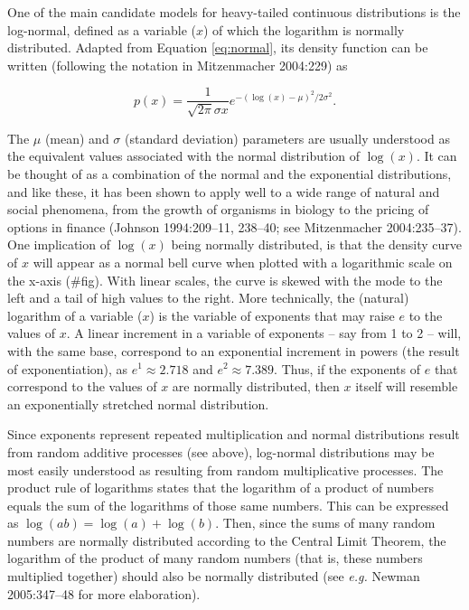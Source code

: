 \documentclass[
  12pt,
]{book}
\begin{document}
One of the main candidate models for heavy-tailed continuous distributions is the log-normal, defined as a variable (\(x\)) of which the logarithm is normally distributed. Adapted from Equation \eqref{eq:normal}, its density function can be written (following the notation in Mitzenmacher 2004:229) as

\begin{equation}
p(x)=\frac{1}{\sqrt{2\pi}\sigma x}e^{-(\log(x)-\mu)^2/2\sigma^2}.
\label{eq:log-normal}
\end{equation}

The \(\mu\) (mean) and \(\sigma\) (standard deviation) parameters are usually understood as the equivalent values associated with the normal distribution of \(\log(x)\). It can be thought of as a combination of the normal and the exponential distributions, and like these, it has been shown to apply well to a wide range of natural and social phenomena, from the growth of organisms in biology to the pricing of options in finance (Johnson 1994:209--11, 238--40; see Mitzenmacher 2004:235--37). One implication of \(\log (x)\) being normally distributed, is that the density curve of \(x\) will appear as a normal bell curve when plotted with a logarithmic scale on the x-axis (\#fig). With linear scales, the curve is skewed with the mode to the left and a tail of high values to the right. More technically, the (natural) logarithm of a variable (\(x\)) is the variable of exponents that may raise \(e\) to the values of \(x\). A linear increment in a variable of exponents -- say from 1 to 2 -- will, with the same base, correspond to an exponential increment in powers (the result of exponentiation), as \(e^1 \approx 2.718\) and \(e^2 \approx 7.389\). Thus, if the exponents of \(e\) that correspond to the values of \(x\) are normally distributed, then \(x\) itself will resemble an exponentially stretched normal distribution.

Since exponents represent repeated multiplication and normal distributions result from random additive processes (see above), log-normal distributions may be most easily understood as resulting from random multiplicative processes. The product rule of logarithms states that the logarithm of a product of numbers equals the sum of the logarithms of those same numbers. This can be expressed as \(\log (ab) = \log (a) + \log (b)\). Then, since the sums of many random numbers are normally distributed according to the Central Limit Theorem, the logarithm of the product of many random numbers (that is, these numbers multiplied together) should also be normally distributed (see \emph{e.g.} Newman 2005:347--48 for more elaboration).
\end{document}

